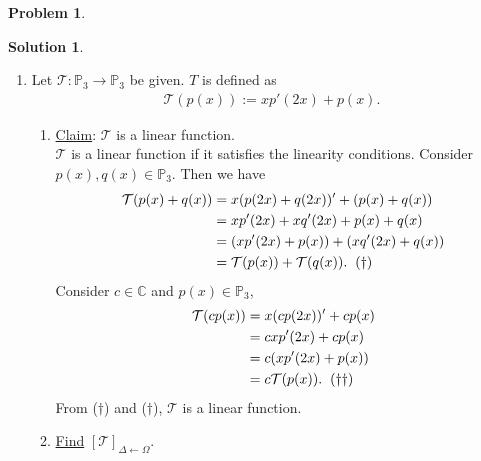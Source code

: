 \documentclass{article}
\theoremstyle{definition}
\newtheorem*{prob*}{Problem}
\newtheorem*{sln*}{Solution}
\newcommand{\T}{\mathcal{T}}
\begin{document}
\begin{prob*}
\begin{sln*}
\begin{enumerate}
			
			\item Let $\T : \mathbb{P}_3 \to \mathbb{P}_3$ be given. $T$ is defined as
			\begin{align*}
			\T(p(x)) := xp'(2x) + p(x).
			\end{align*}
			\begin{enumerate}
				\item \underline{Claim}: $\T$ is a linear function.\\
				$\T$ is a linear function if it satisfies the linearity conditions. Consider $p(x), q(x) \in \mathbb{P}_3$. Then we have
				\begin{align*}
				\T(p(x) + q(x)) &= x(p(2x) + q(2x))' + (p(x) + q(x))\\
				&= xp'(2x) + xq'(2x) + p(x) + q(x)\\
				&= (xp'(2x) + p(x))  + (xq'(2x) + q(x))\\ 
				&= \T(p(x)) + \T(q(x)).\hspace{0.2cm}(\dagger)
				\end{align*}
				Consider $c\in \mathbb{C}$ and $p(x)\in \mathbb{P}_3$,
				\begin{align*}
				\T(cp(x)) &= x(cp(2x))' + cp(x)\\
				&= cxp'(2x) + cp(x)\\ &= c(xp'(2x) + p(x))\\ &= c\T(p(x)).\hspace{0.2cm}(\dagger\dagger)
				\end{align*}
				From ($\dagger$) and ($\dagger$), $\T$ is a linear function. \\
				
				
				
				
				\item \underline{Find} $[\T]_{\Delta\leftarrow\Omega}$.\\
				

\end{enumerate}
\end{enumerate}
\end{sln*}
\end{prob*}
\end{document}
